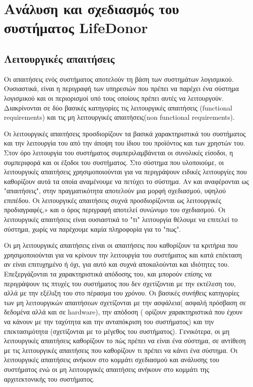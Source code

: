 \graphicspath{ {Figures/system_analysis/} }

\chapter{Ανάλυση και σχεδιασμός του συστήματος LifeDonor}\label{ch:Analysis of LifeDonor}
\section{Λειτουργικές απαιτήσεις}\label{sec:Functional Requirements}

	Οι απαιτήσεις ενός συστήματος αποτελούν τη βάση των συστημάτων λογισμικού. Ουσιαστικά, είναι η περιγραφή των υπηρεσιών που πρέπει να παρέχει ένα σύστημα λογισμικού και οι περιορισμοί υπό τους οποίους πρέπει αυτές να λειτουργούν. Διακρίνονται σε δύο βασικές κατηγορίες τις λειτουργικές απαιτήσεις (functional requirements) και τις μη λειτουργικές απαιτήσεις(non functional requirements). 
	
	Οι λειτουργικές απαιτήσεις προσδιορίζουν τα βασικά χαρακτηριστικά του συστήματος και την λειτουργία του από την άποψη του ίδιου του προϊόντος και των χρηστών του. Στον όρο λειτουργία του συστήματος συμπεριλαμβάνεται οι συνολικές είσοδοι, η συμπεριφορά και οι έξοδοι του συστήματος. Στο σύστημα που υλοποιούμε, οι λειτουργικές απαιτήσεις χρησιμοποιούνται για να περιγράψουν ειδικές λειτουργίες που καθορίζουν αυτά τα οποία αναμένουμε να πετύχει το σύστημα. Αν και αναφέρονται ως "απαιτήσεις", στην πραγματικότητα αποτελούν μια μορφή σχεδιασμού, υψηλού επιπέδου. Οι λειτουργικές απαιτήσεις συχνά προσδιορίζονται ως λειτουργικές προδιαγραφές,» και ο όρος περιγραφή αποτελεί συνώνυμο του σχεδιασμού. Οι λειτουργικές απαιτήσεις είναι ουσιαστικά το "τι" λειτουργία θέλουμε να επιτελεί το σύστημα, χωρίς να παρέχουμε καμία πληροφορία για το "πως".
	
	Οι μη λειτουργικές απαιτήσεις είναι οι απαιτήσεις που καθορίζουν τα κριτήρια που χρησιμοποιούνται για να κρίνουν την λειτουργία του συστήματος και κατά επέκταση  αν είναι επιτυχημένο ή όχι, για αυτό και συχνά αποκαλούνται και ιδιότητες του. Επεξεργάζονται τα χαρακτηριστικά απόδοσης του, και μπορούν επίσης να περιγράψουν τις πτυχές του συστήματος που δεν σχετίζονται με την εκτέλεση του, αλλά με την εξέλιξη του στο πέρασμα του χρόνου. Οι βασικές συνήθεις κατηγορίες των μη λειτουργικών απαιτήσεων σχετίζονται με την ασφάλεια( ασφαλή πρόσβαση σε δεδομένα αλλά και σε hardware), την απόδοση ( ορίζουν χαρακτηριστικά που έχουν να κάνουν με την ταχύτητα και την ανταπόκριση του συστήματος) και την επεκτασιμότητα (σχετίζονται με το μέγεθος του συστήματος). Γενικότερα, οι μη λειτουργικές απαιτήσεις καθορίζουν το πώς πρέπει να είναι ένα σύστημα, σε αντίθεση με τις λειτουργικές απαιτήσεις που καθορίζουν τι πρέπει να κάνει ένα σύστημα. Οι λειτουργικές απαιτήσεις ανήκουν στο κομμάτι σχεδιασμού και ανάλυσης του συστήματος ενώ οι μη λειτουργικές απαιτήσεις ανήκουν στο κομμάτι της αρχιτεκτονικής του συστήματος.
	
